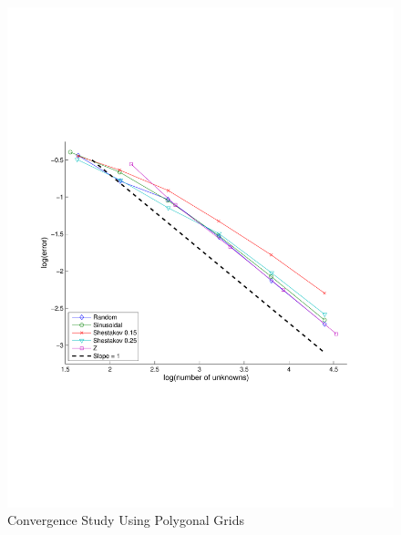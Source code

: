 \documentclass[preprint,10pt]{elsarticle}
\begin{document}
\begin{figure}[!hbtp]
\centering
\includegraphics[scale=0.5]{../pwld_diffusion/results/convergence/cv_poly}
\caption{Convergence Study Using Polygonal Grids}
\label{fig:conv_rate_poly}
\end{figure}
\end{document}
